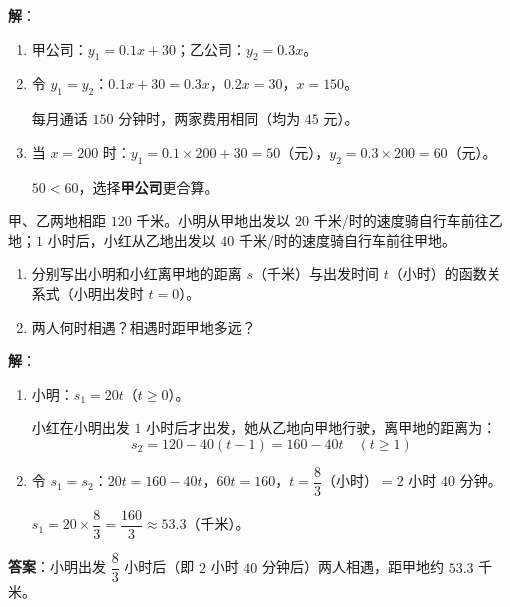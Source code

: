 \documentclass[12pt, a4paper]{ctexart}
\begin{document}
\textbf{解}：

\begin{enumerate}[leftmargin=2em]
  \item 甲公司：$y_1 = 0.1x + 30$；\quad 乙公司：$y_2 = 0.3x$。

  \item 令 $y_1 = y_2$：$0.1x + 30 = 0.3x$，$0.2x = 30$，$x = 150$。

  每月通话 $150$ 分钟时，两家费用相同（均为 $45$ 元）。

  \item 当 $x = 200$ 时：$y_1 = 0.1 \times 200 + 30 = 50$（元），$y_2 = 0.3 \times 200 = 60$（元）。

  $50 < 60$，选择\textbf{甲公司}更合算。
\end{enumerate}

\begin{appbox}
甲、乙两地相距 $120$ 千米。小明从甲地出发以 $20$ 千米/时的速度骑自行车前往乙地；$1$ 小时后，小红从乙地出发以 $40$ 千米/时的速度骑自行车前往甲地。

\begin{enumerate}[leftmargin=2em]
  \item 分别写出小明和小红离甲地的距离 $s$（千米）与出发时间 $t$（小时）的函数关系式（小明出发时 $t=0$）。
  \item 两人何时相遇？相遇时距甲地多远？
\end{enumerate}
\end{appbox}

\textbf{解}：

\begin{enumerate}[leftmargin=2em]
  \item 小明：$s_1 = 20t$（$t \geq 0$）。

  小红在小明出发 $1$ 小时后才出发，她从乙地向甲地行驶，离甲地的距离为：
  $$s_2 = 120 - 40(t - 1) = 160 - 40t \quad (t \geq 1)$$

  \item 令 $s_1 = s_2$：$20t = 160 - 40t$，$60t = 160$，$t = \dfrac{8}{3}$（小时）$= 2$ 小时 $40$ 分钟。

  $s_1 = 20 \times \dfrac{8}{3} = \dfrac{160}{3} \approx 53.3$（千米）。
\end{enumerate}

\textbf{答案}：小明出发 $\dfrac{8}{3}$ 小时后（即 $2$ 小时 $40$ 分钟后）两人相遇，距甲地约 $53.3$ 千米。

\end{document}
